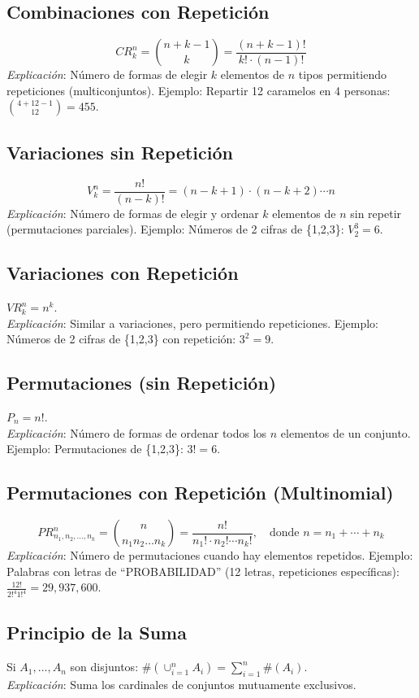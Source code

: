 \documentclass{article}
\begin{document}
\subsection{Combinaciones con Repetición}
\[
CR_k^n = \binom{n + k - 1}{k} = \frac{(n + k - 1)!}{k! \cdot (n-1)!}
\]
\textit{Explicación}: Número de formas de elegir \( k \) elementos de \( n \) tipos permitiendo repeticiones (multiconjuntos). Ejemplo: Repartir 12 caramelos en 4 personas: \( \binom{4 + 12 - 1}{12} = 455 \).

\subsection{Variaciones sin Repetición}
\[
V_k^n = \frac{n!}{(n-k)!} = (n - k + 1) \cdot (n - k + 2) \cdots n
\]
\textit{Explicación}: Número de formas de elegir y ordenar \( k \) elementos de \( n \) sin repetir (permutaciones parciales). Ejemplo: Números de 2 cifras de \{1,2,3\}: \( V_2^3 = 6 \).

\subsection{Variaciones con Repetición}
\( VR_k^n = n^k \). \\
\textit{Explicación}: Similar a variaciones, pero permitiendo repeticiones. Ejemplo: Números de 2 cifras de \{1,2,3\} con repetición: \( 3^2 = 9 \).

\subsection{Permutaciones (sin Repetición)}
\( P_n = n! \). \\
\textit{Explicación}: Número de formas de ordenar todos los \( n \) elementos de un conjunto. Ejemplo: Permutaciones de \{1,2,3\}: \( 3! = 6 \).

\subsection{Permutaciones con Repetición (Multinomial)}
\[
PR_{n_1, n_2, \dots, n_k}^n = \binom{n}{n_1 n_2 \dots n_k} = \frac{n!}{n_1! \cdot n_2! \cdots n_k!}, \quad \text{donde } n = n_1 + \cdots + n_k
\]
\textit{Explicación}: Número de permutaciones cuando hay elementos repetidos. Ejemplo: Palabras con letras de ``PROBABILIDAD'' (12 letras, repeticiones específicas): \( \frac{12!}{{2!}^4 {1!}^4} = 29,937,600 \).

\subsection{Principio de la Suma}
Si \( A_1, \dots, A_n \) son disjuntos: \( \#(\cup_{i=1}^n A_i) = \sum_{i=1}^n \#(A_i) \). \\
\textit{Explicación}: Suma los cardinales de conjuntos mutuamente exclusivos.
\end{document}
